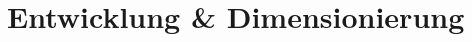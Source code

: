 \documentclass[main.tex]{subfiles} %
\begin{document}
\section{Entwicklung \& Dimensionierung}


\newpage


\newpage


\newpage
\end{document}
